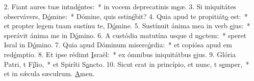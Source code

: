 2. Fiant aures tuæ intnd\uline{é}ntes:~* in vocem deprecatinis m\uline{e}æ.
3. Si iniquitátes observávers, D\uline{ó}mine:~* Dómine, quis sstin\uline{é}bit?
4. Quia apud te propitiát\uline{o} est:~* et propter legem tuam sustínu te, D\uline{ó}mine.
5. Sustínuit ánima mea in verb \uline{e}jus:~* sperávit ánima me in D\uline{ó}mino.
6. A custódia matutína usque d n\uline{o}ctem:~* speret Isral in D\uline{ó}mino.
7. Quia apud Dóminum miserc\uline{ó}rdia:~* et copiósa apud em red\uline{é}mptio.
8. Et ipse rédimt \uline{I}sraël:~* ex ómnibus iniquitátbus \uline{e}jus.
9. Glória Patri, t F\uline{í}lio,~* et Spiríti S\uline{a}ncto.
10. Sicut erat in princípio, et nunc, t s\uline{e}mper,~* et in sǽcula sæculrum. \uline{A}men.

